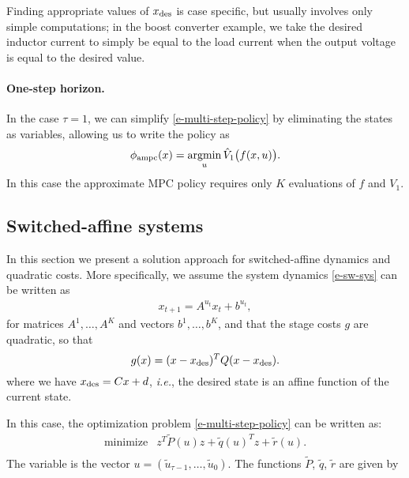\documentclass[12pt]{article}
\newcommand{\ie}{{\it i.e.}}
\newcommand{\argmin}{\mathop{\rm argmin}}
\begin{document}
Finding appropriate values of $x_{\rm des}$ is case specific,
but usually involves only simple computations;
in the boost converter example,
we take the desired inductor current to simply be equal to the load current
when the output voltage is equal to the desired value.



\paragraph{One-step horizon.}
In the case $\tau = 1$, we can simplify 
\eqref{e-multi-step-policy}
by eliminating the states as variables,
allowing us to write the policy as
\begin{align*}
\label{e-one-step-policy}
\phi_{\rm ampc}(x) = \argmin_{u} \hat V_1 \big(f(x,u)\big).
\end{align*}
In this case the approximate MPC policy requires only 
$K$ evaluations of $f$ and $V_1$.


\subsection{Switched-affine systems}
In this section we present a solution approach
for switched-affine dynamics and quadratic costs.
More specifically, we assume the system dynamics \eqref{e-sw-sys}
can be written as
\begin{align*}
x_{t+1} = A^{u_t}x_t + b^{u_t},
\end{align*}
for matrices $A^1, \ldots, A^K$ and vectors $b^1,\ldots, b^K$,
and that the stage costs $g$ are quadratic, so that
\[
g(x) = (x-x_{\rm des})^T Q (x-x_{\rm des}).
\]
where we have $x_{\rm des} = Cx + d$,
\ie, the desired state is an affine function of the current state.

In this case, 
the optimization problem \eqref{e-multi-step-policy}
can be written as:
\begin{equation}
\begin{array}{ll}
\mbox{minimize} &  
  z^T \tilde P(u) z + \tilde q(u)^T z + \tilde r(u). \\
\end{array}
\label{e-opt-ctrl-sw-aff}
\end{equation}
The variable is the vector 
$u = (\tilde u_{\tau-1}, \ldots, \tilde u_0)$.
The functions $\tilde P$, $\tilde q$, $\tilde r$
are given by
\end{document}
